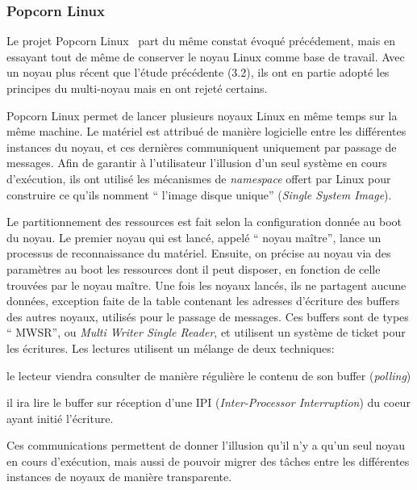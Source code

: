       
    \subsubsection{Popcorn Linux}

      Le projet Popcorn Linux~\citep{barbalacepopcorn} part du même constat
      évoqué précédement, mais en essayant tout de même de conserver le noyau
      Linux comme base de travail. Avec un noyau plus récent que l'étude
      précédente (3.2), ils ont en partie adopté les principes du multi-noyau
      mais en ont rejeté certains.

      Popcorn Linux permet de lancer plusieurs noyaux Linux en même temps sur la
      même machine. Le matériel est attribué de manière logicielle entre les
      différentes instances du noyau, et ces dernières communiquent uniquement
      par passage de messages. Afin de garantir à l’utilisateur l’illusion d’un
      seul système en cours d'exécution, ils ont utilisé les mécanismes de
      \textit{namespace} offert par Linux pour construire ce qu’ils nomment ``
      l’image disque unique'' (\textit{Single System Image}).

      Le partitionnement des ressources est fait selon la configuration donnée
      au boot du noyau. Le premier noyau qui est lancé, appelé `` noyau
      maître'', lance un processus de reconnaissance du matériel. Ensuite, on
      précise au noyau via des paramètres au boot les ressources dont il peut
      disposer, en fonction de celle trouvées par le noyau maître. Une fois les
      noyaux lancés, ils ne partagent aucune données, exception faite de la
      table contenant les adresses d’écriture des buffers des autres noyaux,
      utilisés pour le passage de messages. Ces buffers sont de types `` MWSR'',
      ou \textit{Multi Writer Single Reader}, et utilisent un système de ticket
      pour les écritures. Les lectures utilisent un mélange de deux
      techniques:\benumline \item le lecteur viendra consulter de manière
      régulière le contenu de son buffer (\textit{polling}) \item il ira lire le
      buffer sur réception d’une IPI (\textit{Inter-Processor Interruption}) du
      coeur ayant initié l’écriture\eenumline.

      Ces communications permettent de donner l’illusion qu’il n’y a qu’un seul
      noyau en cours d’exécution, mais aussi de pouvoir migrer des tâches entre
      les différentes instances de noyaux de manière transparente.

